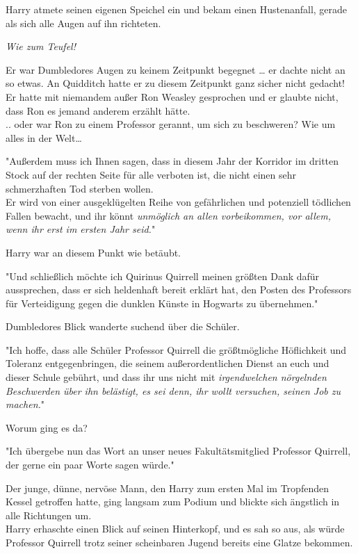 {Harry atmete seinen eigenen Speichel ein und bekam einen Hustenanfall, gerade als sich alle Augen auf ihn richteten.

\emph{Wie zum Teufel!}

Er war Dumbledores Augen zu keinem Zeitpunkt begegnet … er dachte nicht an so etwas. An Quidditch hatte er zu diesem Zeitpunkt ganz sicher nicht gedacht!\\ Er hatte mit niemandem außer Ron Weasley gesprochen und er glaubte nicht, dass Ron es jemand anderem erzählt hätte.\\ .. oder war Ron zu einem Professor gerannt, um sich zu beschweren? Wie um alles in der Welt…

"Außerdem muss ich Ihnen sagen, dass in diesem Jahr der Korridor im dritten Stock auf der rechten Seite für alle verboten ist, die nicht einen sehr schmerzhaften Tod sterben wollen.\\ Er wird von einer ausgeklügelten Reihe von gefährlichen und potenziell tödlichen Fallen bewacht, und ihr könnt \emph{unmöglich an allen vorbeikommen, vor allem, wenn ihr erst im ersten Jahr seid.}"

Harry war an diesem Punkt wie betäubt.

"Und schließlich möchte ich Quirinus Quirrell meinen größten Dank dafür aussprechen, dass er sich heldenhaft bereit erklärt hat, den Posten des Professors für Verteidigung gegen die dunklen Künste in Hogwarts zu übernehmen."

Dumbledores Blick wanderte suchend über die Schüler.

"Ich hoffe, dass alle Schüler Professor Quirrell die größtmögliche Höflichkeit und Toleranz entgegenbringen, die seinem außerordentlichen Dienst an euch und dieser Schule gebührt, und dass ihr uns nicht mit \emph{irgendwelchen nörgelnden Beschwerden über ihn belästigt, es sei denn, ihr wollt versuchen, seinen Job zu machen.}"

Worum ging es da?

"Ich übergebe nun das Wort an unser neues Fakultätsmitglied Professor Quirrell, der gerne ein paar Worte sagen würde."

Der junge, dünne, nervöse Mann, den Harry zum ersten Mal im Tropfenden Kessel getroffen hatte, ging langsam zum Podium und blickte sich ängstlich in alle Richtungen um.\\ Harry erhaschte einen Blick auf seinen Hinterkopf, und es sah so aus, als würde Professor Quirrell trotz seiner scheinbaren Jugend bereits eine Glatze bekommen.

}
